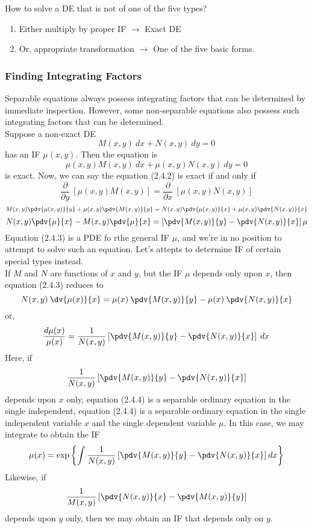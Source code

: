 How to solve a DE that is not of one of the five types?
\begin{enumerate}
    \item Either multiply by proper IF $ \to $ Exact DE
    \item Or, appropriate transformation $ \to $ One of the five basic forms.
\end{enumerate}


\subsubsection{Finding Integrating Factors}

Separable equations always possess integrating factors that can be determined by immediate inspection. However, some non-separable equations also possess such integrating factors that can be determined.\\

Suppose a non-exact DE
\begin{equation}
    M(x,y) \: d{x} + N(x,y) \: d{y} = 0
\end{equation}
has an IF $\mu(x,y)$. Then the equation is
\begin{equation}
    \mu(x,y)M(x,y) \: d{x} + \mu(x,y)N(x,y) \: d{y} = 0
\end{equation}
is exact. Now, we can say the equation (2.4.2) is exact if and only if \[
    \frac{\partial}{\partial{y}} \: \left[ \mu(x,y)M(x,y) \right] = \frac{\partial}{\partial{x}} \: \left[ \mu(x,y)N(x,y) \right]
\]\[
    M(x,y)\pdv{\mu(x,y)}{y} + \mu(x,y)\pdv{M(x,y)}{y} = N(x,y)\pdv{\mu(x,y)}{x} + \mu(x,y)\pdv{N(x,y)}{x} 
\]
\begin{equation}
    N(x,y)\pdv{\mu}{x} - M(x,y)\pdv{\mu}{x} = \left[ \pdv{M(x,y)}{y} - \pdv{N(x,y)}{x} \right] \mu
\end{equation}
Equation (2.4.3) is a PDE fo rthe general IF  $\mu$, and we're in no position to attempt to solve such an equation. Let's attepts to determine IF of certain special types instead.\\
If $M$ and $N$ are functions of $x$ and $y$, but the IF $\mu$ depends only upon $x$, then equation (2.4.3) reduces to
\[
    N(x,y) \: \dv{\mu(x)}{x} = \mu(x) \: \pdv{M(x,y)}{y} - \mu(x) \: \pdv{N(x,y)}{x}
\] or,
    \begin{equation}
        \frac{d\mu(x)}{\mu(x)} = \frac{1}{N(x,y)} \left[ \pdv{M(x,y)}{y} - \pdv{N(x,y)}{x} \right] \: d{x}
    \end{equation}
Here, if \[
    \frac{1}{N(x,y)} \left[ \pdv{M(x,y)}{y} - \pdv{N(x,y)}{x} \right]  
\]
depends upon $x$ only, equation (2.4.4) is a separable ordinary equation in the single independent, equation (2.4.4) is a separable ordinary equation in the single independent variable $x$ and the single dependent variable $\mu$. In this case, we may integrate to obtain the IF
\[
    \mu(x) = \exp \left\{ \int{ \frac{1}{N(x,y)} \left[ \pdv{M(x,y)}{y} - \pdv{N(x,y)}{x} \right] } \: d{x} \right\}
\]
Likewise, if
\[
    \frac{1}{M(x,y)} \left[ \pdv{N(x,y)}{x} - \pdv{M(x,y)}{y} \right]
\] depends upon $y$ only, then we may obtain an IF that depends only on $y$.

